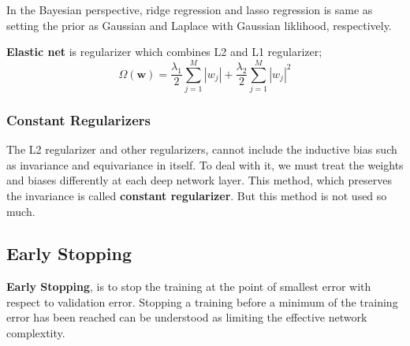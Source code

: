 \documentclass{article}
\begin{document}
        In the Bayesian perspective, ridge regression and lasso regression is same as setting the prior as
        Gaussian and Laplace with Gaussian liklihood, respectively.

        \textbf{Elastic net} is regularizer which combines L2 and L1 regularizer;
        \[
        \Omega(\textbf{w}) = \frac{\lambda_1}{2}\sum_{j=1}^{M}\left|w_j\right|
        + \frac{\lambda_2}{2}\sum_{j=1}^{M}\left|w_j\right|^2
        \]

        \subsubsection{Constant Regularizers}
        The L2 regularizer and other regularizers, cannot include the inductive bias such as invariance and equivariance in itself.
        To deal with it, we must treat the weights and biases differently at each deep network layer. This method, which preserves the invariance is called
        \textbf{constant regularizer}. But this method is not used so much.

    \subsection{Early Stopping}
        \textbf{Early Stopping}, is to stop the training at the point of smallest error with respect to validation error.
        Stopping a training before a minimum of the training error has been reached can be understood as limiting the effective network complextity.
        
\end{document}
